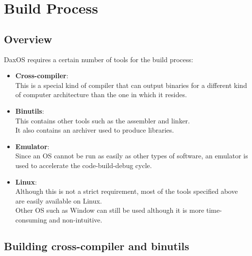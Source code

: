 \chapter{Build Process}\label{chapter:Build Process}

\section{Overview}\label{section:Overview}

DaxOS requires a certain number of tools for the build process:
\begin{itemize}
    \item \textbf{Cross-compiler}:\\
        This is a special kind of compiler that can output binaries for a different kind of computer architecture
        than the one in which it resides.

    \item \textbf{Binutils}:\\
        This contains other tools such as the assembler and linker.\\
        It also contains an archiver used to produce libraries.

    \item \textbf{Emulator}:\\
        Since an OS cannot be run as easily as other types of software, an emulator is used to accelerate the code-build-debug cycle.

    \item \textbf{Linux}:\\
        Although this is not a strict requirement, most of the tools specified above are easily available on Linux. \\
        Other OS such as Window can still be used although it is more time-consuming and non-intuitive.
\end{itemize}

\section{Building cross-compiler and binutils}\label{section:Building cross-compiler and binutil}

